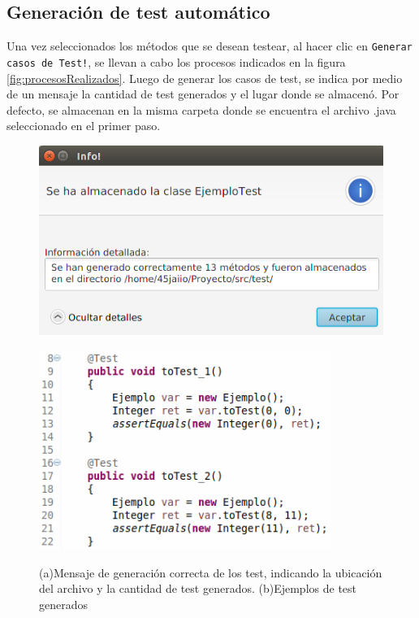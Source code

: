 \documentclass{llncs}
\begin{document}
    \subsection{Generación de test automático}
    Una vez seleccionados los métodos que se desean testear, al hacer clic en \texttt{Generar casos de Test!}, se llevan a cabo los procesos indicados en la figura
    \ref{fig:procesosRealizados}. Luego de generar los casos de test, se indica por medio de un mensaje la cantidad de test generados y el lugar donde se almacenó.
    Por defecto, se almacenan en la misma carpeta donde se encuentra el archivo .java seleccionado en el primer paso.
    \begin{figure}[hbt!]
     \centering
      \begin{minipage}[H]{0.45\textwidth}
      \centering
      \includegraphics[width=1\textwidth]{screenshots/3-generados}
    \end{minipage}
    \centering
    \begin{minipage}[H]{0.45\textwidth}
      \centering
      \includegraphics[width=0.85\textwidth]{screenshots/EjemploTestGen}\\
    \end{minipage}
    \caption{(a)Mensaje de generación correcta de los test, indicando la ubicación del archivo y la cantidad de test generados. (b)Ejemplos de test generados}
    \label{cicloInf}
    \end{figure}
    
\end{document}

